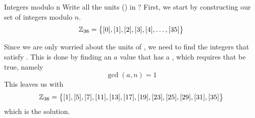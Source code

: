 \begin{example}{Integers modulo n}
  Write all the units () in ?
  \tcblower{}
  First, we start by constructing our set of integers modulo $n$.
  \begin{equation*}
    \operatorname{\mathbb{Z}}_{36} = \bigl\lbrace [0], [1], [2], [3], [4], \ldots, [35] \bigr\rbrace
  \end{equation*}

  Since we are only worried about the units of , we need to find the integers that satisfy .
  This is done by finding an $a$ value that has a , which requires that  be true, namely
  \begin{equation*}
    \gcd(a, n) = 1
  \end{equation*}
  This leaves us with
  \begin{equation*}
    \operatorname{\mathbb{Z}}_{36} = \bigl\lbrace [1], [5], [7], [11], [13], [17], [19], [23], [25], [29], [31], [35] \bigr\rbrace
  \end{equation*}
  which is the solution.
\end{example}

